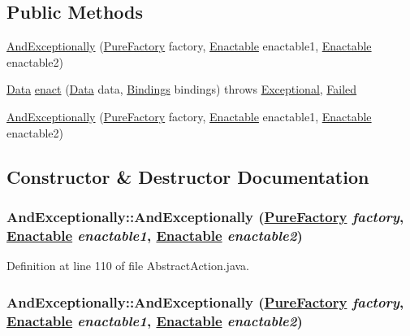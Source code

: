 \subsection*{Public Methods}
\begin{CompactItemize}
\item 
\hyperlink{classAndExceptionally_a0}{And\-Exceptionally} (\hyperlink{classPureFactory}{Pure\-Factory} factory, \hyperlink{interfaceEnactable}{Enactable} enactable1, \hyperlink{interfaceEnactable}{Enactable} enactable2)
\item 
\hyperlink{interfaceData}{Data} \hyperlink{classAndExceptionally_a1}{enact} (\hyperlink{interfaceData}{Data} data, \hyperlink{interfaceBindings}{Bindings} bindings) throws \hyperlink{classExceptional}{Exceptional}, \hyperlink{classFailed}{Failed}
\item 
\hyperlink{classAndExceptionally_a2}{And\-Exceptionally} (\hyperlink{classPureFactory}{Pure\-Factory} factory, \hyperlink{interfaceEnactable}{Enactable} enactable1, \hyperlink{interfaceEnactable}{Enactable} enactable2)
\end{CompactItemize}


\subsection{Constructor \& Destructor Documentation}
\hypertarget{classAndExceptionally_a0}{
\subsubsection[AndExceptionally]{\setlength{\rightskip}{0pt plus 5cm}And\-Exceptionally::And\-Exceptionally (\hyperlink{classPureFactory}{Pure\-Factory} {\em factory}, \hyperlink{interfaceEnactable}{Enactable} {\em enactable1}, \hyperlink{interfaceEnactable}{Enactable} {\em enactable2})}}
\label{classAndExceptionally_a0}




Definition at line 110 of file Abstract\-Action.java.\hypertarget{classAndExceptionally_a2}{
\subsubsection[AndExceptionally]{\setlength{\rightskip}{0pt plus 5cm}And\-Exceptionally::And\-Exceptionally (\hyperlink{classPureFactory}{Pure\-Factory} {\em factory}, \hyperlink{interfaceEnactable}{Enactable} {\em enactable1}, \hyperlink{interfaceEnactable}{Enactable} {\em enactable2})}}
\label{classAndExceptionally_a2}




